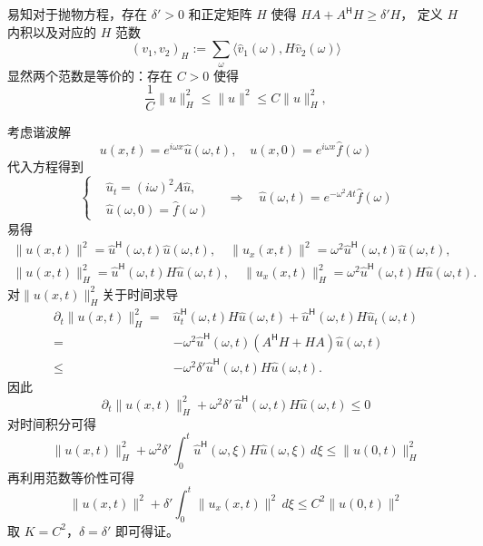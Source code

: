 \begin{solution*}
    易知对于抛物方程，存在 $\delta' >0$ 和正定矩阵 $H$ 使得 $H A + A^\mathsf{H} H \ge \delta' H$，
    定义 $H$ 内积以及对应的 $H$ 范数
    \[
        (v_1,v_2)_H := \sum_\omega \langle\hat{v}_1(\omega),H \hat{v}_2(\omega)\rangle
    \]
    显然两个范数是等价的：存在 $C>0$ 使得
    \[
        \frac{1}{C} \| u \|_H^2  \le \| u \|^2 \le C \| u \|_H^2,
    \]

    考虑谐波解
    \[
        u(x,t) = e^{i \omega x} \hat{u}(\omega,t),\quad
        u(x,0) = e^{i \omega x} \hat{f}(\omega)
    \]
    代入方程得到
    \[
        \left\{
        \begin{aligned}
             & \hat{u}_t = (i \omega)^2 A \hat{u}, \\
             & \hat{u}(\omega,0) = \hat{f}(\omega)
        \end{aligned}
        \right.
        \quad \Rightarrow \quad
        \hat{u}(\omega,t) = e^{- \omega^2 A t}\hat{f}(\omega)
    \]
    易得
    \begin{gather*}
        \| u(x,t) \|^2 = \hat{u}^\mathsf{H}(\omega,t) \hat{u}(\omega,t),\quad
        \| u_x(x,t) \|^2 = \omega^2 \hat{u}^\mathsf{H}(\omega,t) \hat{u}(\omega,t), \\
        \| u(x,t) \|_H^2 = \hat{u}^\mathsf{H}(\omega,t) H \hat{u}(\omega,t),\quad
        \| u_x(x,t) \|_H^2 = \omega^2 \hat{u}^\mathsf{H}(\omega,t) H \hat{u}(\omega,t).
    \end{gather*}
    对$\| u(x,t) \|_H^2$关于时间求导
    \begin{align*}
        \partial_t \| u(x,t) \|_H^2
        ={}   & \hat{u}_t^\mathsf{H}(\omega,t) H \hat{u}(\omega,t) + \hat{u}^\mathsf{H}(\omega,t) H \hat{u}_t(\omega,t) \\
        ={}   & - \omega^2 \hat{u}^\mathsf{H}(\omega,t) (A^\mathsf{H} H + H A) \hat{u}(\omega,t)                        \\
        \le{} & - \omega^2 \delta' \hat{u}^\mathsf{H}(\omega,t) H \hat{u}(\omega,t).
    \end{align*}
    因此
    \[
        \partial_t \| u(x,t) \|_H^2 + \omega^2 \delta'\, \hat{u}^\mathsf{H}(\omega,t) H \hat{u}(\omega,t) \le 0
    \]
    对时间积分可得
    \[
        \| u(x,t) \|_H^2  +\omega^2  \delta' \int_0^t \hat{u}^\mathsf{H}(\omega,\xi) H \hat{u}(\omega,\xi) \,d\xi \le \| u(0,t) \|_H^2
    \]
    再利用范数等价性可得
    \[
        \| u(x,t) \|^2  + \delta' \int_0^t \| u_x(x,t) \|^2 \,d\xi \le C^2 \| u(0,t) \|^2
    \]
    取 $K=C^2$，$\delta = \delta'$ 即可得证。
\end{solution*}

